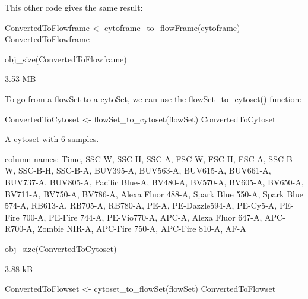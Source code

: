 \documentclass[
  letterpaper,
  DIV=11,
  numbers=noendperiod]{scrartcl}
\newenvironment{Shaded}{\begin{snugshade}}{\end{snugshade}}
\newcommand{\FunctionTok}[1]{\textcolor[rgb]{0.28,0.35,0.67}{#1}}
\newcommand{\NormalTok}[1]{\textcolor[rgb]{0.00,0.23,0.31}{#1}}
\newcommand{\OtherTok}[1]{\textcolor[rgb]{0.00,0.23,0.31}{#1}}
\begin{document}
This other code gives the same result:

\begin{Shaded}
\begin{Highlighting}[]
\NormalTok{ConvertedToFlowframe }\OtherTok{\textless{}{-}} \FunctionTok{cytoframe\_to\_flowFrame}\NormalTok{(cytoframe)}
\NormalTok{ConvertedToFlowframe}
\end{Highlighting}
\end{Shaded}

\begin{Shaded}
\begin{Highlighting}[]
\FunctionTok{obj\_size}\NormalTok{(ConvertedToFlowframe)}
\end{Highlighting}
\end{Shaded}

3.53 MB

To go from a flowSet to a cytoSet, we can use the flowSet\_to\_cytoset()
function:

\begin{Shaded}
\begin{Highlighting}[]
\NormalTok{ConvertedToCytoset }\OtherTok{\textless{}{-}} \FunctionTok{flowSet\_to\_cytoset}\NormalTok{(flowSet)}
\NormalTok{ConvertedToCytoset}
\end{Highlighting}
\end{Shaded}

A cytoset with 6 samples.

column names: Time, SSC-W, SSC-H, SSC-A, FSC-W, FSC-H, FSC-A, SSC-B-W,
SSC-B-H, SSC-B-A, BUV395-A, BUV563-A, BUV615-A, BUV661-A, BUV737-A,
BUV805-A, Pacific Blue-A, BV480-A, BV570-A, BV605-A, BV650-A, BV711-A,
BV750-A, BV786-A, Alexa Fluor 488-A, Spark Blue 550-A, Spark Blue 574-A,
RB613-A, RB705-A, RB780-A, PE-A, PE-Dazzle594-A, PE-Cy5-A, PE-Fire
700-A, PE-Fire 744-A, PE-Vio770-A, APC-A, Alexa Fluor 647-A, APC-R700-A,
Zombie NIR-A, APC-Fire 750-A, APC-Fire 810-A, AF-A

\begin{Shaded}
\begin{Highlighting}[]
\FunctionTok{obj\_size}\NormalTok{(ConvertedToCytoset)}
\end{Highlighting}
\end{Shaded}

3.88 kB

\begin{Shaded}
\begin{Highlighting}[]
\NormalTok{ConvertedToFlowset }\OtherTok{\textless{}{-}} \FunctionTok{cytoset\_to\_flowSet}\NormalTok{(flowSet)}
\NormalTok{ConvertedToFlowset}
\end{Highlighting}
\end{Shaded}
\end{document}
